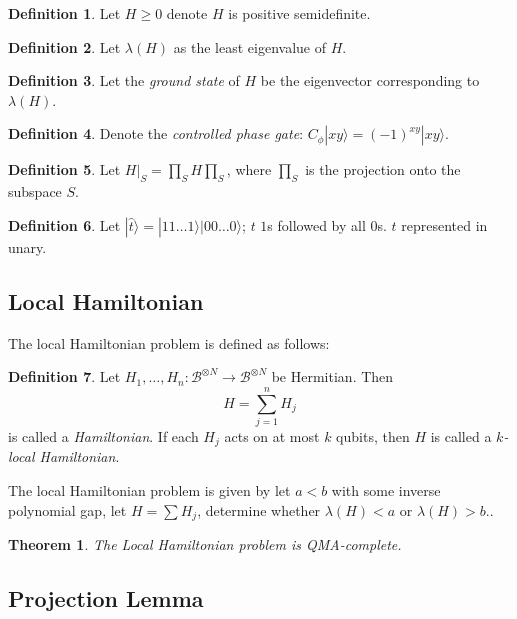 \documentclass{article}
\newtheorem{theorem}{Theorem}[section]
\theoremstyle{definition}
\newtheorem{definition}{Definition}[section]
\begin{document}
\begin{definition}
	Let $H\geq0$ denote $H$ is positive semidefinite.
\end{definition}

\begin{definition}
	Let $\lambda(H)$ as the least eigenvalue of $H$.
\end{definition}

\begin{definition}
	Let the \emph{ground state} of $H$ be the eigenvector corresponding to $\lambda(H)$.
\end{definition}

\begin{definition}
	Denote the \emph{controlled phase gate}: $C_\phi|xy\rangle=(-1)^{xy}|xy\rangle$.
\end{definition}

\begin{definition}
	Let $H\big|_S=\prod_SH\prod_S$, where $\prod_S$ is the projection onto the subspace $S$.
\end{definition}

\begin{definition}
	Let $|\widehat{t}\rangle=|11\ldots1\rangle |00\ldots0\rangle$; $t$ $1$s followed by all $0$s. $t$ represented in unary.
\end{definition}

\subsection{Local Hamiltonian}

The local Hamiltonian problem is defined as follows:

\begin{definition}
	Let $H_1, \ldots, H_n:\mathcal{B}^{\otimes N}\rightarrow\mathcal{B}^{\otimes N}$ be Hermitian. Then $$H=\sum_{j=1}^nH_j$$ is called a \emph{Hamiltonian}.
	If each $H_j$ acts on at most $k$ qubits, then $H$ is called a \emph{$k$-local Hamiltonian}.
\end{definition}

The local Hamiltonian problem is given by let $a<b$ with some inverse polynomial gap, let $H=\sum H_j$, determine whether $\lambda(H)<a$ or $\lambda(H)>b$..

\begin{theorem}
	The Local Hamiltonian problem is QMA-complete.
\end{theorem}

\subsection{Projection Lemma}
\end{document}
